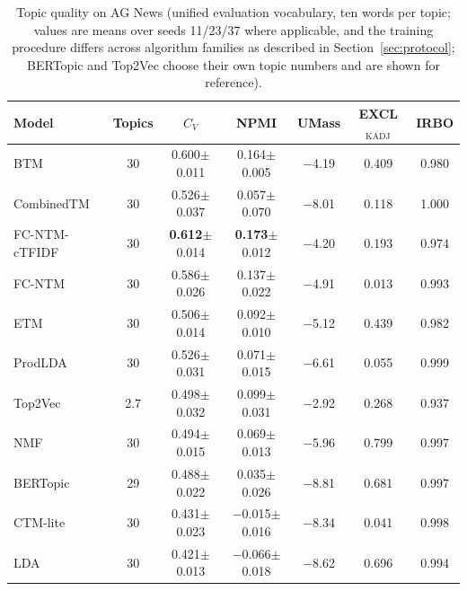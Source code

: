 \documentclass[11pt]{article}
\newcommand{\fcntm}{FC-NTM}
\begin{document}
\begin{table}[t]
\centering
\caption{Topic quality on AG News (unified evaluation vocabulary, ten words per topic; values are means over seeds 11/23/37 where applicable, and the training procedure differs across algorithm families as described in Section~\ref{sec:protocol}; BERTopic and Top2Vec choose their own topic numbers and are shown for reference).}
\label{tab:agnews}
\small
\begin{tabular}{lcccccc}
\toprule
Model & Topics & $C_V$ & NPMI & UMass & EXCL$_{\mathrm{KADJ}}$ & IRBO \\
\midrule
BTM & 30 & 0.600$\pm$0.011 & 0.164$\pm$0.005 & $-$4.19 & 0.409 & 0.980 \\
CombinedTM & 30 & 0.526$\pm$0.037 & 0.057$\pm$0.070 & $-$8.01 & 0.118 & 1.000 \\
\fcntm{}-cTFIDF & 30 & \textbf{0.612}$\pm$0.014 & \textbf{0.173}$\pm$0.012 & $-$4.20 & 0.193 & 0.974 \\
\fcntm{} & 30 & 0.586$\pm$0.026 & 0.137$\pm$0.022 & $-$4.91 & 0.013 & 0.993 \\
ETM & 30 & 0.506$\pm$0.014 & 0.092$\pm$0.010 & $-$5.12 & 0.439 & 0.982 \\
ProdLDA & 30 & 0.526$\pm$0.031 & 0.071$\pm$0.015 & $-$6.61 & 0.055 & 0.999 \\
Top2Vec & 2.7 & 0.498$\pm$0.032 & 0.099$\pm$0.031 & $-$2.92 & 0.268 & 0.937 \\
NMF & 30 & 0.494$\pm$0.015 & 0.069$\pm$0.013 & $-$5.96 & 0.799 & 0.997 \\
BERTopic & 29 & 0.488$\pm$0.022 & 0.035$\pm$0.026 & $-$8.81 & 0.681 & 0.997 \\
CTM-lite & 30 & 0.431$\pm$0.023 & $-$0.015$\pm$0.016 & $-$8.34 & 0.041 & 0.998 \\
LDA & 30 & 0.421$\pm$0.013 & $-$0.066$\pm$0.018 & $-$8.62 & 0.696 & 0.994 \\
\bottomrule
\end{tabular}
\end{table}
\end{document}
